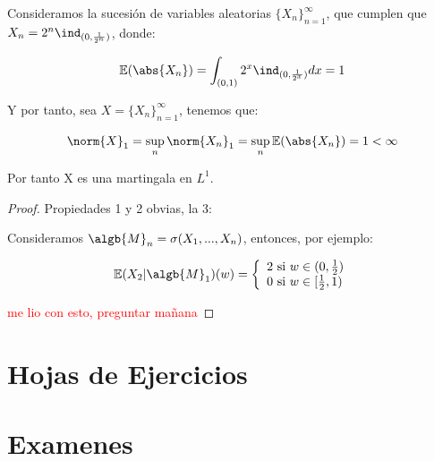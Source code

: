 \documentclass{apuntes}
\begin{document}
\begin{example}
\begin{enumerate}
\begin{example}
Consideramos la sucesión de variables aleatorias $\{X_n\}_{n=1}^{\infty}$, que cumplen que $X_n = 2^n \ind_{(0, \frac{1}{2^n})}$, donde:

$$\mathbb{E}(\abs{X_n})= \int_{(0,1)} 2^x \ind_{(0, \frac{1}{2^x})} dx=1$$

Y por tanto, sea $X=\{X_n\}_{n=1}^{\infty}$, tenemos que:

$$\norm{X}_1 = \sup_n \norm{X_n}_1 = \sup_n \mathbb{E}(\abs{X_n}) = 1 < \infty$$

Por tanto X es una martingala en $L^1$.
\begin{proof}
Propiedades 1 y 2 obvias, la 3:

Consideramos $\algb{M}_n=\sigma(X_1,...,X_n)$, entonces, por ejemplo:

$$
\mathbb{E}(X_2|\algb{M}_1)(w) =
  \left\lbrace
  \begin{array}{l}
     2 \text{ si } w \in (0,\frac{1}{2}) \\
     0 \text{ si } w \in [\frac{1}{2}, 1) \\
  \end{array}
  \right.
$$

\textcolor{red}{me lio con esto, preguntar mañana}
\end{proof}

\end{example}


\end{enumerate}
\end{example}









%



\chapter{Hojas de Ejercicios}


\chapter{Examenes}

\end{document}
